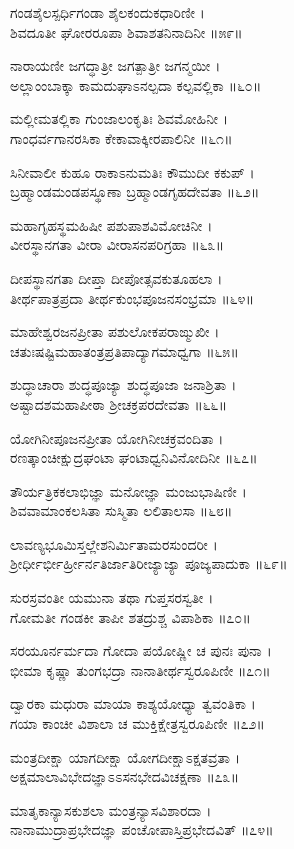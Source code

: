 ಗಂಡಶೈಲಸ್ಪರ್ಧಿಗಂಡಾ ಶೈಲಕಂದುಕಧಾರಿಣೀ ।\\
ಶಿವದೂತೀ ಘೋರರೂಪಾ ಶಿವಾಶತನಿನಾದಿನೀ ॥೫೯॥

ನಾರಾಯಣೀ ಜಗದ್ಧಾತ್ರೀ ಜಗತ್ಪಾತ್ರೀ ಜಗನ್ಮಯೀ ।\\
ಅಲ್ಲಾಂಂಬಾಕ್ಕಾ ಕಾಮದುಘಾಽನಲ್ಪದಾ ಕಲ್ಪವಲ್ಲಿಕಾ ॥೬೦॥

ಮಲ್ಲೀಮತಲ್ಲಿಕಾ ಗುಂಜಾಲಂಕೃತಿಃ ಶಿವಮೋಹಿನೀ ।\\
ಗಾಂಧರ್ವಗಾನರಸಿಕಾ ಕೇಕಾವಾಕ್ಕೀರಪಾಲಿನೀ ॥೬೧॥

ಸಿನೀವಾಲೀ ಕುಹೂ ರಾಕಾಽನುಮತಿಃ ಕೌಮುದೀ ಕಕುಪ್ ।\\
ಬ್ರಹ್ಮಾಂಡಮಂಡಪಸ್ಥೂಣಾ ಬ್ರಹ್ಮಾಂಡಗೃಹದೇವತಾ ॥೬೨॥

ಮಹಾಗೃಹಸ್ಥಮಹಿಷೀ ಪಶುಪಾಶವಿಮೋಚಿನೀ ।\\
ವೀರಸ್ಥಾನಗತಾ ವೀರಾ ವೀರಾಸನಪರಿಗ್ರಹಾ ॥೬೩॥

ದೀಪಸ್ಥಾನಗತಾ ದೀಪ್ತಾ ದೀಪೋತ್ಸವಕುತೂಹಲಾ ।\\
ತೀರ್ಥಪಾತ್ರಪ್ರದಾ ತೀರ್ಥಕುಂಭಪೂಜನಸಂಭ್ರಮಾ ॥೬೪॥

ಮಾಹೇಶ್ವರಜನಪ್ರೀತಾ ಪಶುಲೋಕಪರಾಙ್ಮುಖೀ ।\\
ಚತುಃಷಷ್ಟಿಮಹಾತಂತ್ರಪ್ರತಿಪಾದ್ಯಾಗಮಾಧ್ವಗಾ ॥೬೫॥

ಶುದ್ಧಾಚಾರಾ ಶುದ್ಧಪೂಜ್ಯಾ ಶುದ್ಧಪೂಜಾ ಜನಾಶ್ರಿತಾ ।\\
ಅಷ್ಟಾದಶಮಹಾಪೀಠಾ ಶ್ರೀಚಕ್ರಪರದೇವತಾ ॥೬೬॥

ಯೋಗಿನೀಪೂಜನಪ್ರೀತಾ ಯೋಗಿನೀಚಕ್ರವಂದಿತಾ ।\\
ರಣತ್ಕಾಂಚೀಕ್ಷುದ್ರಘಂಟಾ ಘಂಟಾಧ್ವನಿವಿನೋದಿನೀ ॥೬೭॥

ತೌರ್ಯತ್ರಿಕಕಲಾಭಿಜ್ಞಾ ಮನೋಜ್ಞಾ ಮಂಜುಭಾಷಿಣೀ ।\\
ಶಿವವಾಮಾಂಕಲಸಿತಾ ಸುಸ್ಮಿತಾ ಲಲಿತಾಲಸಾ ॥೬೮॥

ಲಾವಣ್ಯಭೂಮಿಸ್ತಲ್ಲೇಶನಿರ್ಮಿತಾಮರಸುಂದರೀ ।\\
ಶ್ರೀರ್ಧೀರ್ಭೀರ್ಹ್ರೀರ್ನತಿರ್ಜಾತಿರೀಜ್ಯಾಜ್ಯಾ ಪೂಜ್ಯಪಾದುಕಾ ॥೬೯॥

ಸುರಸ್ರವಂತೀ ಯಮುನಾ ತಥಾ ಗುಪ್ತಸರಸ್ವತೀ ।\\
ಗೋಮತೀ ಗಂಡಕೀ ತಾಪೀ ಶತದ್ರುಶ್ಚ ವಿಪಾಶಿಕಾ ॥೭೦॥

ಸರಯೂರ್ನರ್ಮದಾ ಗೋದಾ ಪಯೋಷ್ಣೀ ಚ ಪುನಃ ಪುನಾ ।\\
ಭೀಮಾ ಕೃಷ್ಣಾ ತುಂಗಭದ್ರಾ ನಾನಾತೀರ್ಥಸ್ವರೂಪಿಣೀ ॥೭೧॥

ದ್ವಾರಕಾ ಮಧುರಾ ಮಾಯಾ ಕಾಶ್ಯಯೋಧ್ಯಾ ತ್ವವಂತಿಕಾ ।\\
ಗಯಾ ಕಾಂಚೀ ವಿಶಾಲಾ ಚ ಮುಕ್ತಿಕ್ಷೇತ್ರಸ್ವರೂಪಿಣೀ ॥೭೨॥

ಮಂತ್ರದೀಕ್ಷಾ ಯಾಗದೀಕ್ಷಾ ಯೋಗದೀಕ್ಷಾಽಕ್ಷತವ್ರತಾ ।\\
ಅಕ್ಷಮಾಲಾವಿಭೇದಜ್ಞಾಽಽಸನಭೇದವಿಚಕ್ಷಣಾ ॥೭೩॥

ಮಾತೃಕಾನ್ಯಾಸಕುಶಲಾ ಮಂತ್ರನ್ಯಾಸವಿಶಾರದಾ ।\\
ನಾನಾಮುದ್ರಾಪ್ರಭೇದಜ್ಞಾ ಪಂಚೋಪಾಸ್ತಿಪ್ರಭೇದವಿತ್ ॥೭೪॥

